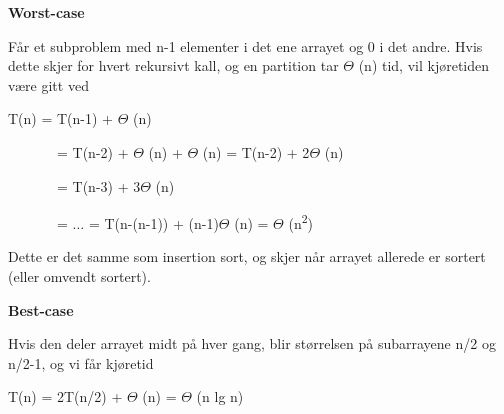 \documentclass[12pt]{report}
\begin{document}
\vspace{\baselineskip}
{\fontsize{14pt}{16.8pt}\selectfont \textbf{Worst-case}\par}\par

Får et subproblem med n-1 elementer i det ene arrayet og 0 i det andre. Hvis dette skjer for hvert rekursivt kall, og en partition tar $ \Theta $ (n) tid, vil kjøretiden være gitt ved\par

T(n) = T(n-1) + $ \Theta $ (n)\par

\ \ \ \ \ \ \  = T(n-2) + $ \Theta $ (n) + $ \Theta $ (n) = T(n-2) + 2$ \Theta $ (n)\par

\ \ \ \ \ \ \  = T(n-3) + 3$ \Theta $ (n)\par

\ \ \ \ \ \ \  = $ \ldots $  = T(n-(n-1)) + (n-1)$ \Theta $ (n) = $ \Theta $ (n\textsuperscript{2})\par

Dette er det samme som insertion sort, og skjer når arrayet allerede er sortert (eller omvendt sortert). \par


\vspace{\baselineskip}
{\fontsize{14pt}{16.8pt}\selectfont \textbf{Best-case}\par}\par

Hvis den deler arrayet midt på hver gang, blir størrelsen på subarrayene n/2 og n/2-1, og vi får kjøretid\par

T(n) = 2T(n/2) + $ \Theta $ (n) = $ \Theta $ (n lg n)\par


\vspace{\baselineskip}

\vspace{\baselineskip}

\vspace{\baselineskip}

\vspace{\baselineskip}

\vspace{\baselineskip}

\vspace{\baselineskip}

\vspace{\baselineskip}
\end{document}

